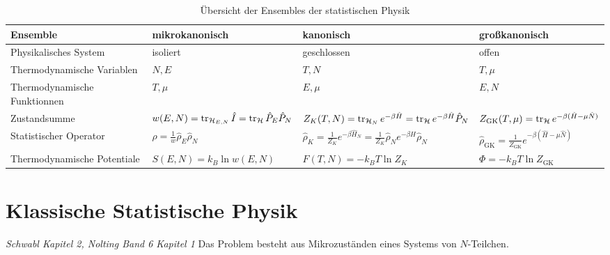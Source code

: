 \begin{table}[htpb]
  \centering
  \begin{tabular}{p{4.5cm}|p{3cm}|p{3cm}|p{3cm}}
    Ensemble & mikrokanonisch & kanonisch & gro\ss{}kanonisch \\
    \hline 
    Physikalisches System & isoliert & geschlossen & offen \\
    \hline 
    Thermodynamische Variablen & $N, E$ & $T,N$ & $T, \mu$ \\
    \hline 
    Thermodynamische Funktionnen & $T, \mu$ & $E, \mu$ & $E, N$ \\ 
    \hline 
    Zustandsumme & $w(E, N) = \operatorname{tr}_{\mathcal{H}_{E,N}} \hat{I} = 
    \operatorname{tr}_{\mathcal{H}} \hat{P}_E \hat{P}_N$ & $Z_K (T, N) = 
    \operatorname{tr}_{\mathcal{H}_N} e ^{-\beta \hat{H}} = 
    \operatorname{tr}_{\mathcal{H}} e^{-\beta \hat{H}} \hat{P}_N$ & 
    $Z_{\text{GK}}(T, \mu) = \operatorname{tr}_{\mathcal{H}} e^{-\beta(\hat{H} -\mu \hat{N})}$ \\
    \hline 
    Statistischer Operator & 
    $ \hat{\rho} = \frac{1}{w} \hat{\rho}_E \hat{\rho}_N$ & 
    $\hat{\rho}_K = \frac{1}{Z_K} e^{-\beta \hat{H}_N}
    = \frac{1}{Z_K} \hat{\rho}_N e ^{-\beta H} \hat{\rho}_N$ & 
    $\hat{\rho}_{\text{GK}} = \frac{1}{Z_{\text{GK}}} e^{-\beta (\hat{H} - \mu \hat{N})}$ \\
    \hline 
    Thermodynamische Potentiale & $S(E, N) = k_B \ln{ w (E, N)}$ & 
    $F(T, N) = -k_B T \ln{Z_K}$ & $\Phi = -k_B T \ln{Z_{\text{GK}}}$ \\
    \hline 
  \end{tabular}
  \caption{\"Ubersicht der Ensembles der statistischen Physik}
\end{table}
%

\section*{Klassische Statistische Physik}
\emph{Schwabl Kapitel 2, Nolting Band 6 Kapitel 1}
Das Problem besteht aus Mikrozust\"anden eines Systems von $N$-Teilchen.
%

